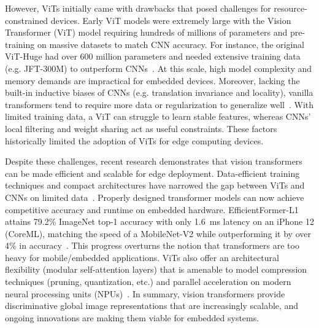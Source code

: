 \documentclass[runningheads,a4paper]{llncs}
\begin{document}
However, ViTs initially came with drawbacks that posed challenges for resource-constrained devices. Early ViT models were extremely large with the Vision Transformer (ViT) model requiring hundreds of millions of parameters and pre-training on massive datasets to match CNN accuracy. For instance, the original ViT-Huge had over 600 million parameters and needed extensive training data (e.g. JFT-300M) to outperform CNNs~\cite{dosovitskiy2021vit}. At this scale, high model complexity and memory demands are impractical for embedded devices. Moreover, lacking the built-in inductive biases of CNNs (e.g. translation invariance and locality), vanilla transformers tend to require more data or regularization to generalize well~\cite{dosovitskiy2021vit}. With limited training data, a ViT can struggle to learn stable features, whereas CNNs’ local filtering and weight sharing act as useful constraints. These factors historically limited the adoption of ViTs for edge computing devices.

Despite these challenges, recent research demonstrates that vision transformers can be made efficient and scalable for edge deployment. Data-efficient training techniques and compact architectures have narrowed the gap between ViTs and CNNs on limited data~\cite{touvron2021deit,mehta2022mobilevit}. Properly 
designed transformer models can now achieve competitive accuracy and runtime on embedded hardware. EfficientFormer-L1 attains 79.2\% ImageNet top-1 accuracy with only 1.6~ms latency on an iPhone 12 (CoreML), matching the speed of a MobileNet-V2 while outperforming it by over 4\% in accuracy~\cite{li2022efficientformer}. This progress overturns the notion that transformers are too heavy for mobile/embedded applications. ViTs also offer an architectural flexibility (modular self-attention layers) that is amenable to model compression techniques (pruning, quantization, etc.) and parallel acceleration on modern neural processing units (NPUs)~\cite{liu2025survey_vit_edge,ceva2023transformer_npu}. In summary, vision transformers provide discriminative global image representations that are increasingly scalable, and ongoing innovations are making them viable for embedded systems. 
\end{document}
